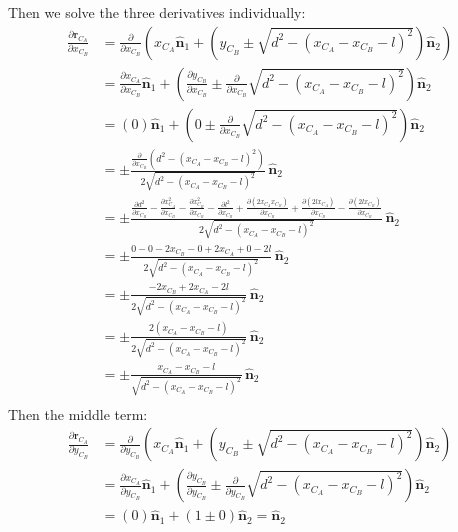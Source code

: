 \documentclass[titlepage]{article}
\begin{document}
Then we solve the three derivatives individually:
\begin{equation}
	\begin{split}
		\frac{\partial\boldsymbol{r}_{C_A}}{\partial x_{C_B} }&=\frac{\partial}{\partial x_{C_B}}\left(x_{C_A}\hat{\boldsymbol{n}}_1+\left(y_{C_B}\pm\sqrt{d^2-(x_{C_A}-x_{C_B}-l)^2}\right)\hat{\boldsymbol{n}}_2\right) \\
		&=\frac{\partial x_{C_A}}{\partial x_{C_B}}\hat{\boldsymbol{n}}_1+\left(\frac{\partial y_{C_B}}{\partial x_{C_B}}\pm\frac{\partial}{\partial x_{C_B}}\sqrt{d^2-(x_{C_A}-x_{C_B}-l)^2}\right)\hat{\boldsymbol{n}}_2 \\
		&=(0)\hat{\boldsymbol{n}}_1+\left(0\pm\frac{\partial}{\partial x_{C_B}}\sqrt{d^2-(x_{C_A}-x_{C_B}-l)^2}\right)\hat{\boldsymbol{n}}_2 \\
		&=\pm\frac{\frac{\partial }{\partial x_{C_B}}(d^2-(x_{C_A}-x_{C_B}-l)^2)}{2\sqrt{d^2-(x_{C_A}-x_{C_B}-l)^2}}\,\hat{\boldsymbol{n}}_2 \\
		&=\pm\frac{\frac{\partial d^2}{\partial x_{C_B}}-\frac{\partial x_{C_A}^2}{\partial x_{C_B}}-\frac{\partial x_{C_B}^2}{\partial x_{C_B}}-\frac{\partial l^2}{\partial x_{C_B}}+\frac{\partial (2x_{C_A}x_{C_B})}{\partial x_{C_B}}+\frac{\partial (2lx_{C_A})}{\partial x_{C_B}}-\frac{\partial (2lx_{C_B})}{\partial x_{C_B}}}{2\sqrt{d^2-(x_{C_A}-x_{C_B}-l)^2}}\,\hat{\boldsymbol{n}}_2 \\
		&=\pm\frac{0-0-2x_{C_B}-0+2x_{C_A}+0-2l}{2\sqrt{d^2-(x_{C_A}-x_{C_B}-l)^2}}\,\hat{\boldsymbol{n}}_2 \\
		&=\pm\frac{-2x_{C_B}+2x_{C_A}-2l}{2\sqrt{d^2-(x_{C_A}-x_{C_B}-l)^2}}\,\hat{\boldsymbol{n}}_2 \\
		&=\pm\frac{2(x_{C_A}-x_{C_B}-l)}{2\sqrt{d^2-(x_{C_A}-x_{C_B}-l)^2}}\,\hat{\boldsymbol{n}}_2 \\
		&=\pm\frac{x_{C_A}-x_{C_B}-l}{\sqrt{d^2-(x_{C_A}-x_{C_B}-l)^2}}\,\hat{\boldsymbol{n}}_2 \\
	\end{split}
\end{equation}
Then the middle term:
\begin{equation}
	\begin{split}
		\frac{\partial\boldsymbol{r}_{C_A}}{\partial y_{C_B} }&=\frac{\partial}{\partial y_{C_B}}\left(x_{C_A}\hat{\boldsymbol{n}}_1+\left(y_{C_B}\pm\sqrt{d^2-(x_{C_A}-x_{C_B}-l)^2}\right)\hat{\boldsymbol{n}}_2\right) \\
		&=\frac{\partial x_{C_A}}{\partial y_{C_B}}\hat{\boldsymbol{n}}_1+\left(\frac{\partial y_{C_B}}{\partial y_{C_B}}\pm\frac{\partial}{\partial y_{C_B}}\sqrt{d^2-(x_{C_A}-x_{C_B}-l)^2}\right)\hat{\boldsymbol{n}}_2 \\
		&=(0)\hat{\boldsymbol{n}}_1+\left(1\pm0\right)\hat{\boldsymbol{n}}_2=\hat{\boldsymbol{n}}_2\\
	\end{split}
\end{equation}
\end{document}
